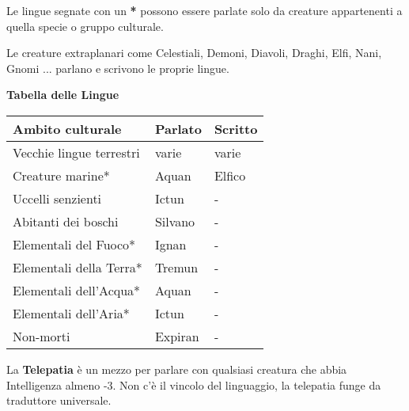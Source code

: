 \begin{multicols}{2}
Le lingue segnate con un \textbf{*} possono essere parlate solo da creature appartenenti a quella specie o gruppo culturale.

Le creature extraplanari come Celestiali, Demoni, Diavoli, Draghi, Elfi, Nani, Gnomi ... parlano e scrivono le proprie lingue.

\smallskip

\textbf{Tabella delle Lingue}

\smallskip

{\noindent\begin{tabularx}{0.48\textwidth}{lll}
\textbf{Ambito culturale}& \textbf{Parlato} & \textbf{Scritto}\\
\toprule
Vecchie lingue terrestri& varie & varie\\
Creature marine* & Aquan& Elfico\\
Uccelli senzienti& Ictun & -\\
Abitanti dei boschi& Silvano& - \\
Elementali del Fuoco* & Ignan&-\\
Elementali della Terra*& Tremun &-\\
Elementali dell'Acqua* & Aquan & - \\
Elementali dell'Aria*& Ictun &-\\
Non-morti & Expiran & - \\
\end{tabularx}}

\medskip

La \textbf{Telepatia} è un mezzo per parlare con qualsiasi creatura che abbia Intelligenza almeno -3. Non c'è il vincolo del linguaggio, la telepatia funge da traduttore universale.


\end{multicols}
